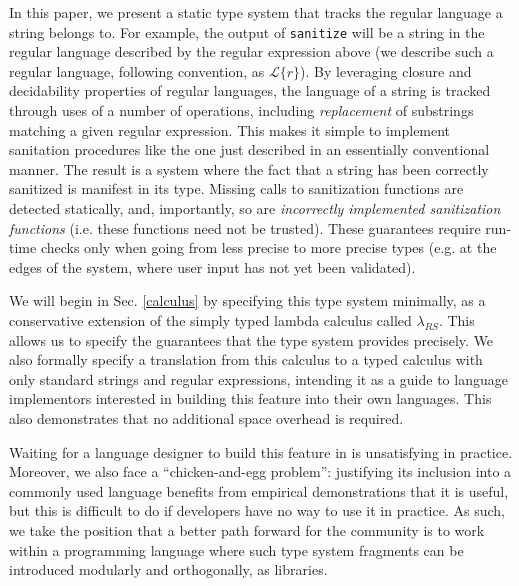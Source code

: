 \documentclass[9pt]{sig-alternate}
\theoremstyle{definition}
\newcommand{\lambdas}{\lambda_{RS}}
\begin{document}
In this paper, we present a static type system that tracks the regular language a string belongs to. For example, the output of \verb|sanitize| will be a string in the regular language described by the regular expression above (we describe such a regular language, following convention, as $\mathcal{L}\{r\}$). By leveraging closure and decidability properties of regular languages, the language of a string is tracked through uses of a number of operations, including \emph{replacement} of substrings matching a given regular expression. This makes it simple to implement sanitation procedures like the one just described in an essentially conventional manner. The result is a system where the fact that a string has been {correctly} sanitized is manifest in its type. Missing calls to sanitization functions are detected statically, and, importantly, so are \emph{incorrectly implemented sanitization functions} (i.e. these functions need not be trusted). These guarantees require run-time checks only when going from less precise to more precise types (e.g. at the edges of the system, where user input has not yet been validated). %

We will begin in Sec. \ref{calculus} by specifying this type system minimally, as a conservative extension of the simply typed lambda calculus called $\lambdas$. This allows us to specify the guarantees that the type system provides precisely. We also formally specify a translation from this calculus to a typed calculus with only standard strings and regular expressions, intending it as a guide to language implementors interested in building this feature into their own languages. This also demonstrates that no additional space overhead is required.

Waiting for a language designer to build this feature in is unsatisfying in practice. Moreover, we also face a ``chicken-and-egg problem'': justifying its inclusion into a commonly used language benefits from empirical demonstrations that it is useful, but this is difficult to do if developers have no way to use it in practice. As such, we take the position that a better path forward for the community is to work within a programming language where such type system fragments can be introduced modularly and orthogonally, as libraries. 
\end{document}
